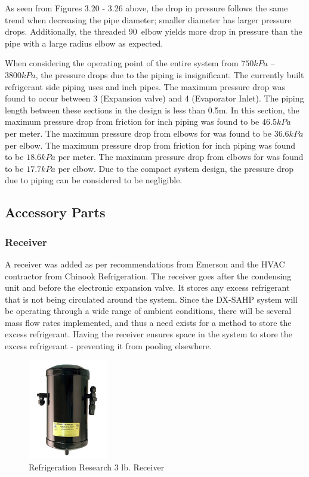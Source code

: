 \medskip
As seen from Figures 3.20 - 3.26 above, the drop in pressure follows the same trend when decreasing the pipe diameter; smaller diameter has larger pressure drops. Additionally, the threaded 90\textdegree \ elbow yields more drop in pressure than the pipe with a large radius elbow as expected.

\medskip
When considering the operating point of the entire system from $750kPa$ – $3800kPa$, the pressure drops due to the piping is insignificant. The currently built refrigerant side piping uses  and  inch pipes. The maximum pressure drop was found to occur between 3 (Expansion valve) and 4 (Evaporator Inlet). The piping length between these sections in the design is less than 0.5m. In this section, the maximum pressure drop from friction for  inch piping was found to be $46.5kPa$ per meter. The maximum pressure drop from elbows for  was found to be $36.6kPa$ per elbow. The maximum pressure drop from friction for  inch piping was found to be $18.6kPa$ per meter. The maximum pressure drop from elbows for  was found to be $17.7kPa$ per elbow. Due to the compact system design, the pressure drop due to piping can be considered to be negligible.

\subsection{Accessory Parts}

\subsubsection{Receiver}

A receiver was added as per recommendations from Emerson and the HVAC contractor from Chinook Refrigeration. The receiver goes after the condensing unit and before the electronic expansion valve. It stores any excess refrigerant that is not being circulated around the system. Since the DX-SAHP system will be operating through a wide range of ambient conditions, there will be several mass flow rates implemented, and thus a need exists for a method to store the excess refrigerant. Having the receiver ensures space in the system to store the excess refrigerant - preventing it from pooling elsewhere.

\medskip
\begin{figure}[H]
    \centering
    \includegraphics[width=3.5cm]{images/reciever.png}
    \caption{Refrigeration Research 3 lb. Receiver}
\end{figure}

